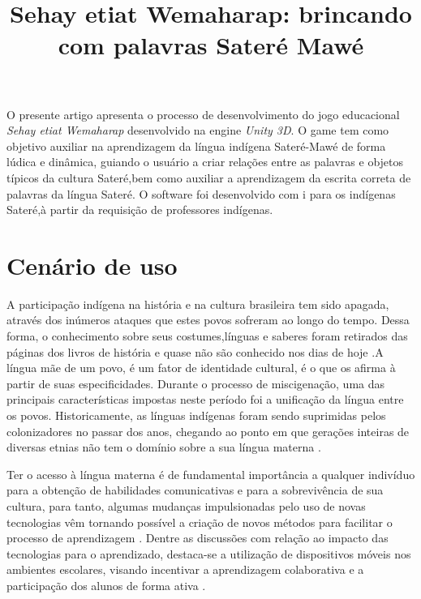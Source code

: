\documentclass[12pt]{article}
\title{Sehay etiat Wemaharap: brincando com palavras Sateré Mawé}
\begin{document}
 

	
	\begin{resumo} 
		O presente artigo apresenta o processo de desenvolvimento do jogo educacional  \textit{Sehay etiat Wemaharap} desenvolvido na engine \textit{Unity 3D}. O game tem como objetivo auxiliar na aprendizagem da língua indígena Sateré-Mawé de forma lúdica e dinâmica, guiando o usuário a criar relações entre as palavras e objetos típicos da cultura Sateré,bem como auxiliar a aprendizagem da escrita correta de palavras da língua Sateré. O software foi desenvolvido com i para os indígenas Sateré,à partir da requisição de professores indígenas.
	\end{resumo}
	
	\section{Cenário de uso}
		A participação indígena na história e na cultura brasileira tem sido apagada, através dos inúmeros ataques que estes povos sofreram ao longo do tempo. Dessa forma, o conhecimento sobre seus costumes,línguas e saberes foram retirados das páginas dos livros de história e quase não são conhecido nos dias de hoje \cite{seki2000linguas}.A língua mãe de um povo, é um fator de identidade cultural, é o que os afirma à partir de suas especificidades. Durante o processo de miscigenação, uma das principais características impostas neste período foi a unificação da língua entre os povos. Historicamente, as línguas indígenas foram sendo suprimidas pelos colonizadores no passar dos anos, chegando ao ponto em que gerações inteiras de diversas etnias não tem o domínio sobre a sua língua materna \cite{cunha2008politicas}.
		
		Ter o acesso à língua materna é de fundamental importância a qualquer indivíduo para a obtenção de habilidades comunicativas e para a sobrevivência de sua cultura\cite{de Souza Pires et al. 2018}, para tanto, algumas mudanças impulsionadas pelo uso de novas tecnologias vêm tornando possível a criação de novos métodos para facilitar o processo de aprendizagem \cite{yamato2017amargana}. Dentre as discussões com relação ao impacto das tecnologias para o aprendizado, destaca-se a utilização de dispositivos móveis nos ambientes escolares, visando incentivar a aprendizagem colaborativa e a participação dos alunos de forma ativa \cite{rossing2012ilearning}.
		
\end{document}
